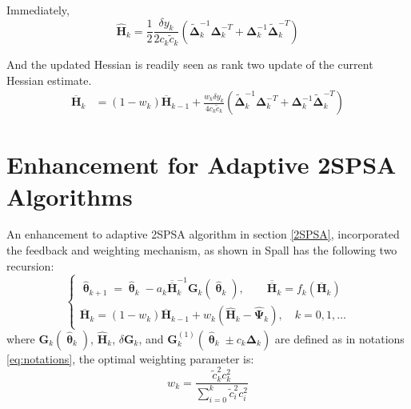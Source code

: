 \documentclass[conference]{IEEEtran}
\newcommand{\bG}{\bm{G}}
\newcommand{\bDelta}{\bm{\Delta}}
\newcommand{\oH}{\bm{\overline{H}}}
\newcommand{\ooH}{\bm{\overline{\overline{H}}}}
\newcommand{\hH}{\bm{\hat{H}}}
\newcommand{\hPsi}{\bm{\hat{\Psi}}}
\newcommand{\htheta}{\bm{\hat{\uptheta}}}
\newcommand{\tDelta}{\bm{\tilde{\Delta}}}
\newcommand{\remove}[1]{}
\begin{document}
Immediately,
\begin{equation} \label{eq:HHat}
\hH_k=\frac{1}{2}\frac{\delta y_k}{2c_k\tilde{c}_k}\left( \tDelta_k^{-1}\bDelta_k^{-T}+\bDelta_k^{-1}\tDelta_k^{-T} \right)
\end{equation}

And the updated Hessian is readily seen as rank two update of
the current Hessian estimate.
\begin{align*}
\oH_k
&= (1 - w_k)\oH_{k-1}
   + \frac{w_k \delta y_k}{4c_k\tilde{c}_k}
     (\tDelta_k^{-1}\bDelta_k^{-T}+\bDelta_k^{-1}\tDelta_k^{-T})
\end{align*}

\remove{
Above gives a rank-2 update from $ \oH_{k-1}^{-1} $ to $ \oH_{k}^{-1} $. Write the sequential recursion of the $ \oH_k^{-1} $ as following:
\begin{equation} \label{eq:2SPSASequentialUpdate}
\begin{dcases}
\bm{B}_k^{-1}
&=\frac{k+1}{k}\oH_{k-1}^{-1}-(\frac{k+1}{k})^2\oH_{k-1}^{-1}\tDelta_k^{-1}\\
&~~~\cdot(b_k^{-1}+\frac{k+1}{k}\bDelta_k^{-T}\oH_{k-1}^{-1}\tDelta_k^{-1})^{-1}\bDelta_k^{-T}\oH_{k-1}^{-1}\\
\oH_k^{-1}
&=\bm{B}_k^{-1}-\bm{B}_k^{-1}\bDelta_k^{-1}\\
&~~~\cdot(b_k^{-1}+\tDelta_k^{-T}\bm{B}_k^{-1}\bDelta_k^{-1})^{-1}\tDelta_k^{-T}\bm{B}_k^{-1}
\end{dcases}
\end{equation}
where
\begin{equation}\label{eq:2SPSAB}
\bm{B}_k=\frac{k}{k+1}\oH_{k-1}+b_k\tDelta_k^{-1}\bDelta_k^{-T}
\end{equation}

Now we analyze the FLOPs of the sequential update \ref{eq:2SPSASequentialUpdate}, compared with the original algorithm \ref{eq:Adaptation}:
}


\section{Enhancement for Adaptive 2SPSA Algorithms} \label{Enhanced 2SPSA}
An enhancement to adaptive 2SPSA algorithm in section \ref{2SPSA}, incorporated the feedback and weighting mechanism, as shown in Spall \cite{Spall2009} has the following two recursion:
\begin{equation} \label{eq:Enhancement}
\begin{cases}
	\htheta_{k+1}=\htheta_k-a_k\ooH_k^{-1} \bG_k(\htheta_k),\qquad \bm{\ooH}_k=f_k(\oH_k)\\
	\oH_k=(1-w_k)\oH_{k-1}+w_k(\hH_k-\hPsi_k), \quad k=0,1,\dots
\end{cases}
\end{equation}
where $\bG_k(\htheta_k)$, $\hH_k$, $\delta\bG_k$, and $\bG_k^{(1)}(\htheta_k\pm c_k\bDelta_k)$ are defined as in notations \ref{eq:notations}, the optimal weighting parameter is:
\begin{equation} \label{eq:weighting}
w_k=\frac{\tilde{c}_k^2c_k^2}{\sum_{i=0}^{k}\tilde{c}_i^2c_i^2}
\end{equation}
\end{document}
